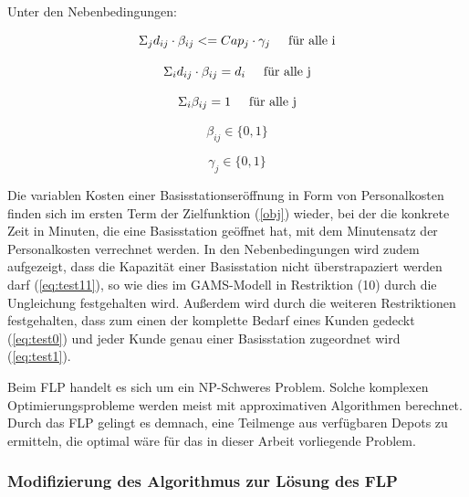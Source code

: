 \documentclass[a4paper,12pt,parskip,bibtotoc,liststotoc]{article}
\begin{document}
Unter den Nebenbedingungen:

\begin{equation} \label{eq:test11}
\Sigma_{j} d_{ij}\cdot \beta_{ij} <= Cap_{j}\cdot \gamma_{j} \hspace{5mm} \text{für alle i}
\end{equation}

\begin{equation} \label{eq:test0}
\Sigma_{i} d_{ij} \cdot \beta_{ij} = d_{i} \hspace{5mm} \text{für alle j}
\end{equation}

\begin{equation} \label{eq:test1}
\Sigma_{i} \beta_{ij} = 1 \hspace{5mm} \text{für alle j}
\end{equation}

\begin{equation} 
\beta_{ij} \in \{0,1\}
\end{equation}

\begin{equation} \label{eq:test}
\gamma_{j} \in \{0,1\}
\end{equation}


Die variablen Kosten einer Basisstationseröffnung in Form von Personalkosten finden sich im ersten Term der Zielfunktion (\ref{obj}) wieder, bei der die konkrete Zeit in Minuten, die eine Basisstation geöffnet hat, mit dem Minutensatz der Personalkosten verrechnet werden.
In den Nebenbedingungen wird zudem aufgezeigt, dass die Kapazität einer Basisstation nicht überstrapaziert werden darf (\ref{eq:test11}), so wie dies im GAMS-Modell in Restriktion (10) durch die Ungleichung festgehalten wird.
Außerdem wird durch die weiteren Restriktionen festgehalten, dass zum einen der komplette Bedarf eines Kunden gedeckt (\ref{eq:test0}) und jeder Kunde genau einer Basisstation zugeordnet wird (\ref{eq:test1}).

Beim FLP handelt es sich um ein NP-Schweres Problem. 
Solche komplexen Optimierungsprobleme werden meist mit approximativen Algorithmen berechnet.
Durch das FLP gelingt es demnach, eine Teilmenge aus verfügbaren Depots zu ermitteln, die optimal wäre für das in dieser Arbeit vorliegende Problem. 

 


\subsubsection{Modifizierung des Algorithmus zur Lösung des FLP}
\end{document}
